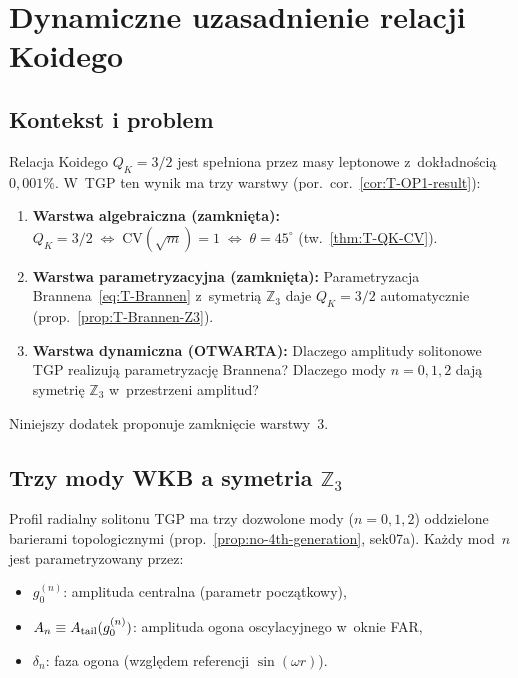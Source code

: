 
\section{Dynamiczne uzasadnienie relacji Koidego}%
\label{app:R2-qk-z3}

\subsection{Kontekst i problem}

Relacja Koidego $Q_K = 3/2$ jest spe\l{}niona przez masy leptonowe
z~dok\l{}adno\'sci\k{a} $0{,}001\%$. W~TGP ten wynik ma trzy
warstwy (por.~cor.~\ref{cor:T-OP1-result}):

\begin{enumerate}[nosep]
  \item \textbf{Warstwa algebraiczna (zamkni\k{e}ta):}
    $Q_K = 3/2 \;\Leftrightarrow\; \mathrm{CV}(\sqrt{m}) = 1
    \;\Leftrightarrow\; \theta = 45^\circ$
    (tw.~\ref{thm:T-QK-CV}).
  \item \textbf{Warstwa parametryzacyjna (zamkni\k{e}ta):}
    Parametryzacja Brannena~\eqref{eq:T-Brannen} z~symetri\k{a}
    $\mathbb{Z}_3$ daje $Q_K = 3/2$ automatycznie
    (prop.~\ref{prop:T-Brannen-Z3}).
  \item \textbf{Warstwa dynamiczna (OTWARTA):}
    Dlaczego amplitudy solitonowe TGP realizuj\k{a}
    parametryzacj\k{e} Brannena? Dlaczego mody
    $n = 0, 1, 2$ daj\k{a} symetri\k{e} $\mathbb{Z}_3$
    w~przestrzeni amplitud?
\end{enumerate}

Niniejszy dodatek proponuje zamkni\k{e}cie warstwy~3.

\subsection{Trzy mody WKB a symetria $\mathbb{Z}_3$}

Profil radialny solitonu TGP ma trzy dozwolone mody ($n = 0, 1, 2$)
oddzielone barierami topologicznymi
(prop.~\ref{prop:no-4th-generation}, sek07a).
Ka\.zdy mod~$n$ jest parametryzowany przez:
\begin{itemize}[nosep]
  \item $g_0^{(n)}$: amplituda centralna (parametr pocz\k{a}tkowy),
  \item $A_n \equiv A_{\rm tail}(g_0^{(n)})$: amplituda ogona
    oscylacyjnego w~oknie FAR,
  \item $\delta_n$: faza ogona (wzgl\k{e}dem
    referencji $\sin(\omega r)$).
\end{itemize}

